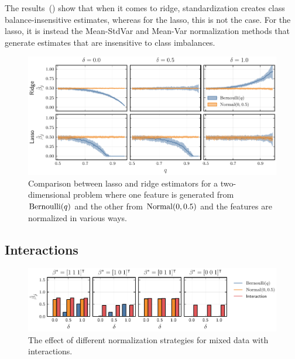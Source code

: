 The results~() show that when it comes to ridge, standardization creates class balance-insensitive estimates, whereas for the lasso, this is not the case. For the lasso, it is instead the Mean-StdVar and Mean-Var normalization methods that generate estimates that are insensitive to class imbalances.

\begin{figure}[htpb]
  \centering
  \includegraphics{plots/mixed_data.pdf}
  \caption{%
    Comparison between lasso and ridge estimators for a two-dimensional problem where one feature is generated from \(\operatorname{Bernoulli}(q)\) and the other from \(\operatorname{Normal}(0, 0.5)\) and the features are normalized in various ways.}
  \label{fig:lasso-ridge-comparison}
\end{figure}

\subsection{Interactions}

\begin{figure}[htpb]
  \centering
  \includegraphics[]{plots/interactions.pdf}
  \caption{%
    The effect of different normalization strategies for mixed data with interactions.
  }
\end{figure}
